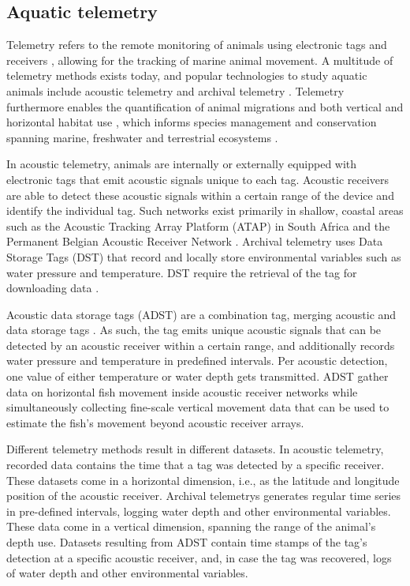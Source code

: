\documentclass[
  authoryear,
  review,
  3p]{elsarticle}
\begin{document}
\hypertarget{aquatic-telemetry}{%
\subsection{Aquatic telemetry}\label{aquatic-telemetry}}

Telemetry refers to the remote monitoring of animals using electronic
tags and receivers \citep{whoriskey_2019}, allowing for the tracking of
marine animal movement. A multitude of telemetry methods exists today,
and popular technologies to study aquatic animals include acoustic
telemetry and archival telemetry \citep{thorstad_2013}. Telemetry
furthermore enables the quantification of animal migrations and both
vertical and horizontal habitat use \citep{hussey_2015}, which informs
species management and conservation spanning marine, freshwater and
terrestrial ecosystems \citep{beger_2010}.

In acoustic telemetry, animals are internally or externally equipped
with electronic tags that emit acoustic signals unique to each tag.
Acoustic receivers are able to detect these acoustic signals within a
certain range of the device and identify the individual tag. Such
networks exist primarily in shallow, coastal areas \citep{hussey_2015}
such as the Acoustic Tracking Array Platform (ATAP) in South Africa
\citep{cowley_2017} and the Permanent Belgian Acoustic Receiver Network
\citep[PBARN,][]{reubens_2019}. Archival telemetry uses Data Storage
Tags (DST) that record and locally store environmental variables such as
water pressure and temperature. DST require the retrieval of the tag for
downloading data \citep{thorstad_2013}.

Acoustic data storage tags (ADST) are a combination tag, merging
acoustic and data storage tags \citep{goossens_2023}. As such, the tag
emits unique acoustic signals that can be detected by an acoustic
receiver within a certain range, and additionally records water pressure
and temperature in predefined intervals. Per acoustic detection, one
value of either temperature or water depth gets transmitted. ADST gather
data on horizontal fish movement inside acoustic receiver networks while
simultaneously collecting fine-scale vertical movement data that can be
used to estimate the fish's movement beyond acoustic receiver arrays.

Different telemetry methods result in different datasets. In acoustic
telemetry, recorded data contains the time that a tag was detected by a
specific receiver. These datasets come in a horizontal dimension, i.e.,
as the latitude and longitude position of the acoustic receiver.
Archival telemetrys generates regular time series in pre-defined
intervals, logging water depth and other environmental variables. These
data come in a vertical dimension, spanning the range of the animal's
depth use. Datasets resulting from ADST contain time stamps of the tag's
detection at a specific acoustic receiver, and, in case the tag was
recovered, logs of water depth and other environmental variables.
\end{document}
